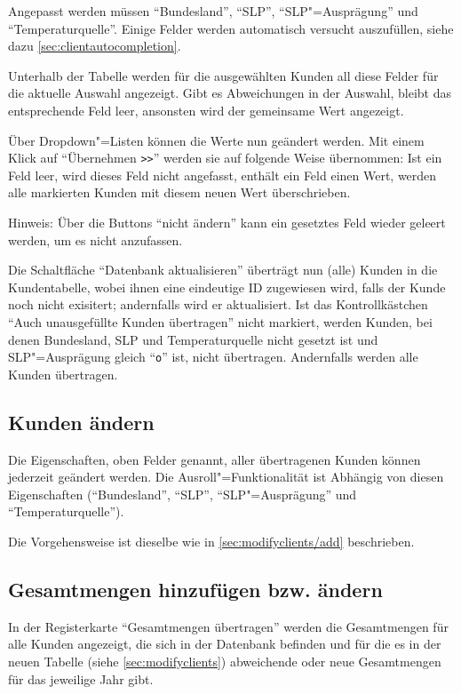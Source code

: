 Angepasst werden müssen "`Bundesland"', "`SLP"', "`SLP"=Ausprägung"' und "`Temperaturquelle"'. Einige Felder werden automatisch versucht auszufüllen, siehe dazu \vref{sec:clientautocompletion}.

Unterhalb der Tabelle werden für die ausgewählten Kunden all diese Felder für die aktuelle Auswahl angezeigt. Gibt es Abweichungen in der Auswahl, bleibt das entsprechende Feld leer, ansonsten wird der gemeinsame Wert angezeigt.

Über Dropdown"=Listen können die Werte nun geändert werden. Mit einem Klick auf "`Übernehmen \verb|>>|"' werden sie auf folgende Weise übernommen: Ist ein Feld leer, wird dieses Feld nicht angefasst, enthält ein Feld einen Wert, werden alle markierten Kunden mit diesem neuen Wert überschrieben.

Hinweis: Über die Buttons "`nicht ändern"' kann ein gesetztes Feld wieder geleert werden, um es nicht anzufassen.


Die Schaltfläche "`Datenbank aktualisieren"' überträgt nun (alle) Kunden in die Kundentabelle, wobei ihnen eine eindeutige ID zugewiesen wird, falls der Kunde noch nicht exisitert; andernfalls wird er aktualisiert. Ist das Kontrollkästchen "`Auch unausgefüllte Kunden übertragen"' nicht markiert, werden Kunden, bei denen Bundesland, SLP und Temperaturquelle nicht gesetzt ist und SLP"=Ausprägung gleich "`\verb|o|"' ist, nicht übertragen. Andernfalls werden alle Kunden übertragen.

\subsection{Kunden ändern}\label{sec:modifyclients/modify}

Die Eigenschaften, oben Felder genannt, aller übertragenen Kunden können jederzeit geändert werden. Die Ausroll"=Funktionalität ist Abhängig von diesen Eigenschaften ("`Bundesland"', "`SLP"', "`SLP"=Ausprägung"' und "`Temperaturquelle"').

Die Vorgehensweise ist dieselbe wie in \vref{sec:modifyclients/add} beschrieben.

\subsection{Gesamtmengen hinzufügen bzw. ändern}

In der Registerkarte "`Gesamtmengen übertragen"' werden die Gesamtmengen für alle Kunden angezeigt, die sich in der Datenbank befinden und für die es in der neuen Tabelle (siehe \vref{sec:modifyclients}) abweichende oder neue Gesamtmengen für das jeweilige Jahr gibt.


